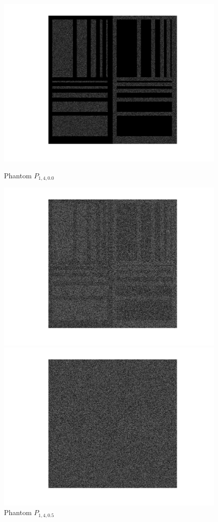 \documentclass[a4paper]{article} %
\begin{document}
\begin{figure}[!htb]
  \includegraphics[width=\linewidth]{Eq_Phantom_0p000_4_1_1.jpg}
	\caption{Phantom $P_{1,4,0.0}$}\label{fig:awesome_image1}
\endminipage\hfill
{}
  \includegraphics[width=\linewidth]{Eq_Phantom_0p500_4_1_1.jpg}
	\caption{Phantom $P_{1,4,0.5}$}\label{fig:awesome_image1}
\endminipage\hfill
{}%
  \includegraphics[width=\linewidth]{Eq_Phantom_0p700_4_1_1.jpg}

\end{figure}
\end{document}
